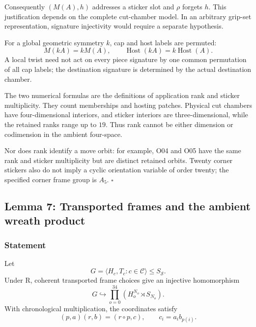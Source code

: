 \documentclass[
  10pt,
  a4paper,
]{article}
\begin{document}
Consequently \((M(A),h)\) addresses a sticker slot and \(\rho\) forgets
\(h\). This justification depends on the complete cut-chamber model. In
an arbitrary grip-set representation, signature injectivity would
require a separate hypothesis.

For a global geometric symmetry \(k\), cap and host labels are permuted:
\begin{equation}
M(kA)=kM(A),\qquad
\operatorname{Host}(kA)=k\operatorname{Host}(A).
\end{equation} A local twist need not act on every piece signature by
one common permutation of all cap labels; the destination signature is
determined by the actual destination chamber.

The two numerical formulas are the definitions of application rank and
sticker multiplicity. They count memberships and hosting patches.
Physical cut chambers have four-dimensional interiors, and sticker
interiors are three-dimensional, while the retained ranks range up to
\(19\). Thus rank cannot be either dimension or codimension in the
ambient four-space.

Nor does rank identify a move orbit: for example, O04 and O05 have the
same rank and sticker multiplicity but are distinct retained orbits.
Twenty corner stickers also do not imply a cyclic orientation variable
of order twenty; the specified corner frame group is \(A_5\).
\(\square\)

\subsection{Lemma 7: Transported frames and the ambient wreath
product}\label{lemma-7-transported-frames-and-the-ambient-wreath-product}

\subsubsection{Statement}\label{statement-6}

Let \begin{equation}
G=\langle H_c,T_c:c\in\mathcal C\rangle\le S_{\mathcal S}.
\end{equation} Under R, coherent transported frame choices give an
injective homomorphism \begin{equation}
G\hookrightarrow
\prod_{o=0}^{34}\left(H_o^{N_o}\rtimes S_{N_o}\right).
\end{equation} With chronological multiplication, the coordinates
satisfy \begin{equation}
(p,a)(r,b)=(r\circ p,c),
\qquad c_i=a_i b_{p(i)}.
\end{equation}
\end{document}
